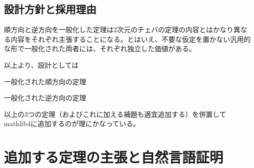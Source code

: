 \documentclass[a4paper,12pt]{bxjsbook}
\newlength{\customindent}
\newenvironment{body}{
  \par
  \begingroup
  \setlength{\leftskip}{\customindent}
  \setlength{\rightskip}{0pt}
  \setlength{\parindent}{1em}
  \setlength{\displayindent}{\customindent}
  \setlength{\displaywidth}{\dimexpr\linewidth-\customindent\relax}
}{
  \par
  \endgroup
}
\theoremstyle{theorem}
\begin{document}
    \subsection{設計方針と採用理由}
    \begin{body}
        \indent 順方向と逆方向を一般化した定理は$2$次元のチェバの定理の内容とはかなり異なる内容をそれぞれ主張することになる。とはいえ、不要な仮定を置かない汎用的な形で一般化された両者には、それぞれ独立した価値がある。

        \indent 以上より、設計としては

        \begin{bodyitemize}
            \item 一般化された順方向の定理
            \item 一般化された逆方向の定理
        \end{bodyitemize}
        \indent 以上の3つの定理（およびこれに加える補題も適宜追加する）を併置してmathlib4に追加するのが理にかなっている。

    \end{body}

    \section{追加する定理の主張と自然言語証明}

\end{document}
